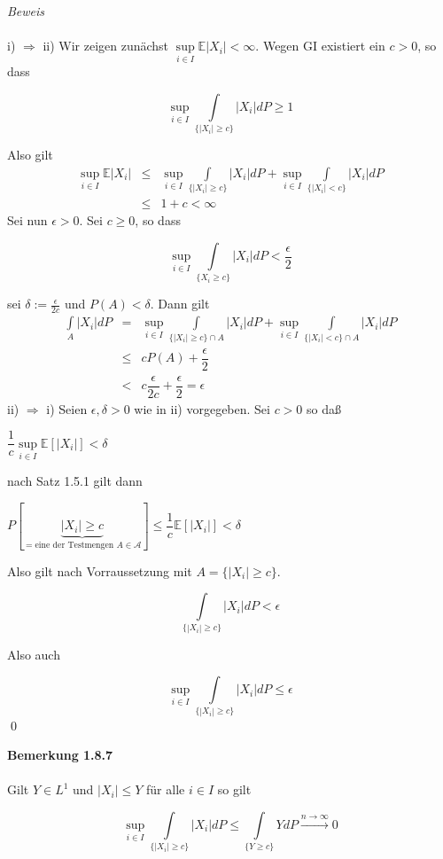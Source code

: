\documentclass[10pt,a4paper]{report}
\newcommand{\E}{\mathbb{E}}
\numberwithin{equation}{section}
\numberwithin{figure}{section}
\theoremstyle{plain}
\theoremstyle{definition}
\theoremstyle{plain}
\theoremstyle{definition}
\theoremstyle{remark}
\theoremstyle{plain}
\theoremstyle{plain}
\theoremstyle{plain}
\newcommand{\1}{ \mathbb{1} } %
\begin{document}
\textit{Beweis}\\\\
i) $\Rightarrow$ ii) Wir zeigen zunächst $\sup\limits_{i \in I} \E|X_i| < \infty$. Wegen GI existiert ein $c>0$, so dass 
\begin{center}
\[\sup\limits_{i \in I} \int\limits_{\{|X_i|\geq c\}}|X_i|dP\geq 1\]
\end{center}
Also gilt
\begin{eqnarray*}
\sup\limits_{i \in I} \E|X_i| &\leq& \sup\limits_{i \in I}\int\limits_{\{|X_i|\geq c\}}|X_i|dP+ \sup\limits_{i \in I}\int\limits_{\{|X_i|< c\}}|X_i|dP\\
&\leq & 1+c < \infty 
\end{eqnarray*}
Sei nun $\epsilon >0$. Sei $c\geq 0$, so dass
\begin{center}
\[\sup\limits_{i \in I} \int\limits_{\{X_i \geq c\}}|X_i|dP <\dfrac{\epsilon}{2}\]
\end{center}
sei $ \delta:=\frac{\epsilon}{2c}$ und $P(A)<\delta$. Dann gilt
\begin{eqnarray*}
\int\limits_A|X_i|dP&=&\sup\limits_{i \in I}\int\limits_{\{|X_i|\geq c\}\cap A}|X_i|dP+ \sup\limits_{i \in I}\int\limits_{\{|X_i|< c\}\cap A}|X_i|dP\\
&\leq & cP(A)+\dfrac{\epsilon}{2}\\
&<& c\dfrac{\epsilon}{2c}+\dfrac{\epsilon}{2}=\epsilon
\end{eqnarray*}
ii) $\Rightarrow$ i) Seien $\epsilon, \delta >0 $ wie in ii) vorgegeben. Sei $c>0$ so daß
\begin{center}
$\dfrac{1}{c}\sup\limits_{i \in I} \E[|X_i|]<\delta$
\end{center}
nach Satz 1.5.1 gilt dann
\begin{center}
$P[\underbrace{|X_i|\geq c}_{= \text{eine der Testmengen } A \in \mathcal{A}}]\leq \dfrac{1}{c}\E[|X_i|]<\delta$
\end{center}
Also gilt nach Vorraussetzung mit $A=\{|X_i|\geq c\}$.
\begin{center}
\[\int\limits_{\{|X_i|\geq c\}}|X_i|dP < \epsilon\]
\end{center}
Also auch
\begin{center}
\[\sup\limits_{i \in I}\int\limits_{\{|X_i|\geq c\}}|X_i|dP \leq \epsilon \] \qed
\end{center}
\textbf{Bemerkung 1.8.7}\\\\
Gilt $Y \in L^1$ und $|X_i| \leq Y$ für alle $i \in I$ so gilt
\begin{center}
\[\sup\limits_{i \in I} \int\limits_{\{|X_i|\geq c\}}|X_i|dP \leq \int\limits_{\{Y \geq c\}}Y dP \overset{n \to \infty}{\to} 0 \]
\end{center}
\end{document}
